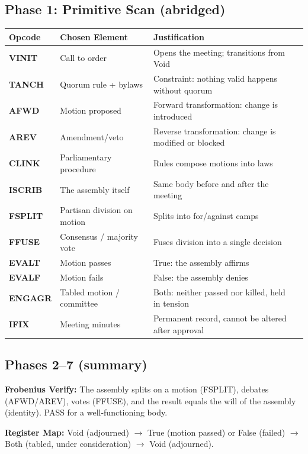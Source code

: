 \documentclass[12pt,a4paper]{article}
\begin{document}
\subsection*{Phase 1: Primitive Scan (abridged)}

{\small
\begin{tabularx}{\textwidth}{>{\bfseries}p{2cm} p{3.8cm} p{6.2cm}X}
\toprule
{\bf Opcode} & {\bf Chosen Element} & {\bf Justification} \\
\midrule
VINIT & Call to order & Opens the meeting; transitions from Void \\
TANCH & Quorum rule + bylaws & Constraint: nothing valid happens without quorum \\
AFWD & Motion proposed & Forward transformation: change is introduced \\
AREV & Amendment/veto & Reverse transformation: change is modified or blocked \\
CLINK & Parliamentary procedure & Rules compose motions into laws \\
ISCRIB & The assembly itself & Same body before and after the meeting \\
FSPLIT & Partisan division on motion & Splits into for/against camps \\
FFUSE & Consensus / majority vote & Fuses division into a single decision \\
EVALT & Motion passes & True: the assembly affirms \\
EVALF & Motion fails & False: the assembly denies \\
ENGAGR & Tabled motion / committee & Both: neither passed nor killed, held in tension \\
IFIX & Meeting minutes & Permanent record, cannot be altered after approval \\
\bottomrule
\end{tabularx}
}

\subsection*{Phases 2--7 (summary)}

\textbf{Frobenius Verify:} The assembly splits on a motion (FSPLIT), debates (AFWD/AREV),
votes (FFUSE), and the result equals the will of the assembly (identity). PASS for
a well-functioning body.

\textbf{Register Map:} Void (adjourned) $\to$ True (motion passed) or False (failed)
$\to$ Both (tabled, under consideration) $\to$ Void (adjourned).
\end{document}
